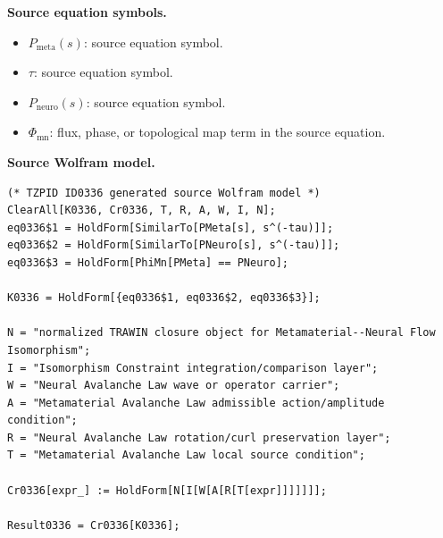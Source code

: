 \begin{minipage}[t]{0.49\linewidth}
\begingroup
\small
\raggedright
\textbf{Source equation symbols.}\par
\begin{itemize}[leftmargin=1.35em,itemsep=1pt,topsep=1pt,parsep=0pt]
    \item $P_{\mathrm{meta}}(s)$: source equation symbol.
    \item $\tau$: source equation symbol.
    \item $P_{\mathrm{neuro}}(s)$: source equation symbol.
    \item $\Phi_{\mathrm{mn}}$: flux, phase, or topological map term in the source equation.
\end{itemize}
\endgroup
\end{minipage}\hfill
\begin{minipage}[t]{0.47\linewidth}
\begingroup
\scriptsize
\raggedright
\textbf{Source Wolfram model.}\par
\begin{Verbatim}[fontsize=\tiny,breaklines=true,breakanywhere=true]
(* TZPID ID0336 generated source Wolfram model *)
ClearAll[K0336, Cr0336, T, R, A, W, I, N];
eq0336$1 = HoldForm[SimilarTo[PMeta[s], s^(-tau)]];
eq0336$2 = HoldForm[SimilarTo[PNeuro[s], s^(-tau)]];
eq0336$3 = HoldForm[PhiMn[PMeta] == PNeuro];

K0336 = HoldForm[{eq0336$1, eq0336$2, eq0336$3}];

N = "normalized TRAWIN closure object for Metamaterial--Neural Flow Isomorphism";
I = "Isomorphism Constraint integration/comparison layer";
W = "Neural Avalanche Law wave or operator carrier";
A = "Metamaterial Avalanche Law admissible action/amplitude condition";
R = "Neural Avalanche Law rotation/curl preservation layer";
T = "Metamaterial Avalanche Law local source condition";

Cr0336[expr_] := HoldForm[N[I[W[A[R[T[expr]]]]]]];

Result0336 = Cr0336[K0336];
\end{Verbatim}
\endgroup
\end{minipage}


